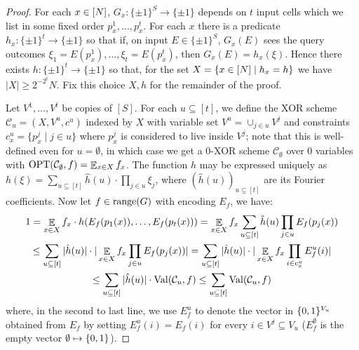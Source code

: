 \begin{proof}
For each $x \in [N]$, $G_x: \{\pm 1\}^S \to \{\pm 1\}$ depends on $t$ input cells which we list in some fixed order $p_x^1,\ldots,p_x^t$. For each $x$ there is a predicate $h_x: \{\pm 1\}^t \to \{\pm 1\}$ so that if, on input $E \in \{\pm 1\}^S$, $G_x(E)$ sees the query outcomes $\xi_1 =E(p^1_x),\ldots, \xi_t=E(p_x^t)$, then $G_x(E) = h_x(\xi)$. Hence there exists $h: \{\pm 1\}^t \to \{\pm 1\}$ so that, for the set $X = \{ x\in [N]\mid h_x = h\}$ we have $|X| \geq 2^{-2^{t}}N$. Fix this choice $X,h$ for the remainder of the proof.

Let $V^1,\ldots,V^t$ be copies of $[S]$. For each $u \subseteq [t]$, we define the XOR scheme $\mathcal{C}_u = (X,V^u,c^u)$ indexed by $X$ with variable set $V^u=\cup_{j \in u} V^j$ and constraints $c^u_x = \{p^j_x \mid j \in u\}$ where $p^j_x$ is considered to live inside $V^j$; note that this is well-defined even for $u = \emptyset$, in which case we get a $0$-XOR scheme $\mathcal{C}_\emptyset$ over 0 variables with $\mathrm{OPT}(\mathcal{C}_\emptyset,f) = \mathop{\mathbb{E}}_{x \in X} f_x$. The function $h$ may be expressed uniquely as $h(\xi)= \sum_{u \subseteq [t]} \hat{h}(u) \cdot \prod_{ j \in u} \xi_j$, where $(\hat{h}(u))_{u \subseteq [t]}$ are its Fourier coefficients. Now let $f\in \mathrm{range}(G)$ with encoding $E_f$, we have:
\begin{gather*}
1 = \mathop{\mathbb{E}}_{x \in X} f_x \cdot h(E_f(p_1(x)),\ldots,E_f(p_t(x)))
= \mathop{\mathbb{E}}_{x \in X} f_x \sum_{u \subseteq [t]} \hat{h}(u) \prod_{j \in u} E_f(p_j(x)) \\
\leq  \sum_{u \subseteq [t]} |\hat{h}(u)| \cdot |\mathop{\mathbb{E}}_{x \in X} f_x \prod_{j \in u} E_f(p_j(x))|  
=  \sum_{u \subseteq [t]} |\hat{h}(u)| \cdot |\mathop{\mathbb{E}}_{x \in X} f_x \prod_{i\in c^u_x} E^u_f(i)|\\
\leq   \sum_{u \subseteq [t]} |\hat{h}(u)| \cdot \mathrm{Val}(\mathcal{C}_u, f)
\leq  \sum_{u \subseteq [t]} \mathrm{Val}(\mathcal{C}_u, f)
\end{gather*}
where, in the second to last line, we use $E_f^u$ to denote the vector in $\{0,1\}^{V_u}$ obtained from $E_f$ by setting $E_f^u(i) = E_f(i)$ for every $i \in V^j \subseteq V_u$ ($E_f^\emptyset$ is the empty vector $\emptyset \mapsto \{0,1\}$).

\end{proof}


